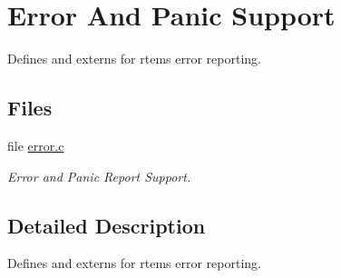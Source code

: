 \hypertarget{group__ErrorPanicSupport}{}\section{Error And Panic Support}
\label{group__ErrorPanicSupport}


Defines and externs for rtems error reporting.  


\subsection*{Files}
\begin{DoxyCompactItemize}
\item 
file \mbox{\hyperlink{error_8c}{error.\+c}}
\begin{DoxyCompactList}\small\item\em Error and Panic Report Support. \end{DoxyCompactList}\end{DoxyCompactItemize}


\subsection{Detailed Description}
Defines and externs for rtems error reporting. 


